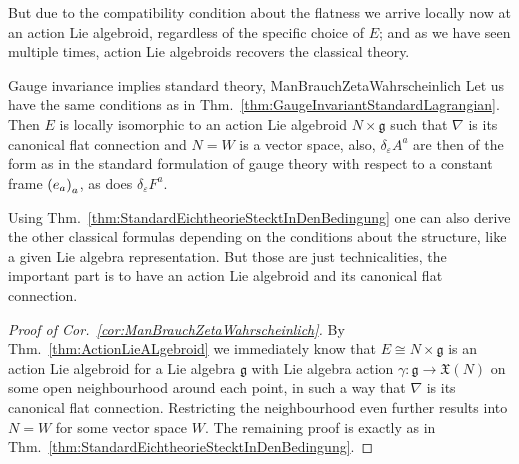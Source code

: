 But due to the compatibility condition about the flatness we arrive locally now at an action Lie algebroid, regardless of the specific choice of $E$; and as we have seen multiple times, action Lie algebroids recovers the classical theory.

\begin{corollaries}{Gauge invariance implies standard theory, \newline \cite[the discussion around Eq.~(9)ff.]{CurvedYMH}}{ManBrauchZetaWahrscheinlich}
Let us have the same conditions as in Thm.~\ref{thm:GaugeInvariantStandardLagrangian}. Then $E$ is locally isomorphic to an action Lie algebroid $N \times \mathfrak{g}$ such that $\nabla$ is its canonical flat connection and $N =W$ is a vector space, also, $\delta_\varepsilon A^a$ are then of the form as in the standard formulation of gauge theory with respect to a constant frame $\mleft( e_a \mright)_a$, as does $\delta_\varepsilon F^a$.
\end{corollaries}

\begin{remark}
\leavevmode\newline
Using Thm.~\ref{thm:StandardEichtheorieStecktInDenBedingung} one can also derive the other classical formulas depending on the conditions about the structure, like a given Lie algebra representation. But those are just technicalities, the important part is to have an action Lie algebroid and its canonical flat connection.
\end{remark}

\begin{proof}[Proof of Cor.~\ref{cor:ManBrauchZetaWahrscheinlich}]
\leavevmode\newline
By Thm.~\ref{thm:ActionLieALgebroid} we immediately know that $E\cong N \times \mathfrak{g}$ is an action Lie algebroid for a Lie algebra $\mathfrak{g}$ with Lie algebra action $\gamma: \mathfrak{g} \to \mathfrak{X}(N)$ on some open neighbourhood around each point, in such a way that $\nabla$ is its canonical flat connection. Restricting the neighbourhood even further results into $N=W$ for some vector space $W$. The remaining proof is exactly as in Thm.~\ref{thm:StandardEichtheorieStecktInDenBedingung}.
\end{proof}

